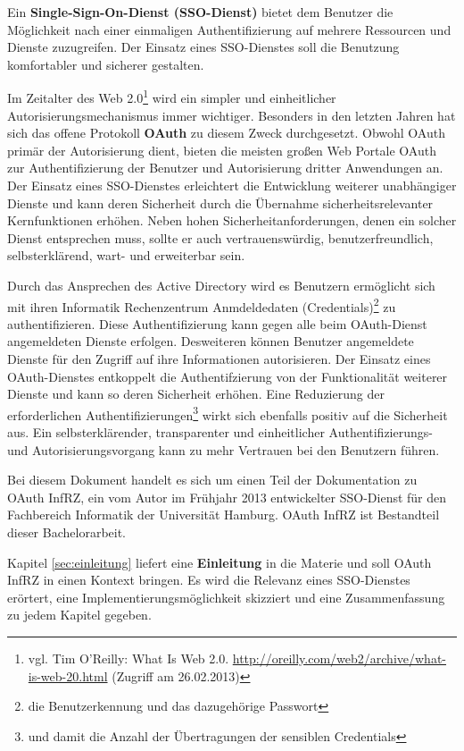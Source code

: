 \documentclass[12pt,a4paper,pointednumbers,abstracton]{scrartcl}
\begin{document}
Ein \textbf{Single-Sign-On-Dienst (SSO-Dienst)} bietet dem Benutzer die Möglichkeit nach einer einmaligen Authentifizierung auf mehrere Ressourcen und Dienste zuzugreifen.
Der Einsatz eines SSO-Dienstes soll die Benutzung komfortabler und sicherer gestalten.

Im Zeitalter des Web 2.0\footnote{vgl. Tim O'Reilly: What Is Web 2.0. \url{http://oreilly.com/web2/archive/what-is-web-20.html} (Zugriff am 26.02.2013)} wird ein simpler und einheitlicher Autorisierungsmechanismus immer wichtiger.
Besonders in den letzten Jahren hat sich das offene Protokoll \textbf{OAuth} zu diesem Zweck durchgesetzt.
Obwohl OAuth primär der Autorisierung dient, bieten die meisten großen Web Portale OAuth zur Authentifizierung der Benutzer und Autorisierung dritter Anwendungen an.
Der Einsatz eines SSO-Dienstes erleichtert die Entwicklung weiterer unabhängiger Dienste und kann deren Sicherheit durch die Übernahme sicherheitsrelevanter Kernfunktionen erhöhen.
Neben hohen Sicherheitanforderungen, denen ein solcher Dienst entsprechen muss, sollte er auch vertrauenswürdig, benutzerfreundlich, selbsterklärend, wart- und erweiterbar sein.

Durch das Ansprechen des Active Directory wird es Benutzern ermöglicht sich mit ihren Informatik Rechenzentrum Anmdeldedaten (Credentials)\footnote{die Benutzerkennung und das dazugehörige Passwort} zu authentifizieren.
Diese Authentifizierung kann gegen alle beim OAuth-Dienst angemeldeten Dienste erfolgen.
Desweiteren können Benutzer angemeldete Dienste für den Zugriff auf ihre Informationen autorisieren.
Der Einsatz eines OAuth-Dienstes entkoppelt die Authentifzierung von der Funktionalität weiterer Dienste und kann so deren Sicherheit erhöhen.
Eine Reduzierung der erforderlichen Authentifizierungen\footnote{und damit die Anzahl der Übertragungen der sensiblen Credentials} wirkt sich ebenfalls positiv auf die Sicherheit aus.
Ein selbsterklärender, transparenter und einheitlicher Authentifizierungs- und Autorisierungsvorgang kann zu mehr Vertrauen bei den Benutzern führen.

Bei diesem Dokument handelt es sich um einen Teil der Dokumentation zu OAuth InfRZ, ein vom Autor im Frühjahr 2013 entwickelter SSO-Dienst für den Fachbereich Informatik der Universität Hamburg.
OAuth InfRZ ist Bestandteil dieser Bachelorarbeit.

Kapitel \ref{sec:einleitung} liefert eine \textbf{Einleitung} in die Materie und soll OAuth InfRZ in einen Kontext bringen.
Es wird die Relevanz eines SSO-Dienstes erörtert, eine Implementierungsmöglichkeit skizziert und eine Zusammenfassung zu jedem Kapitel gegeben.
\end{document}

